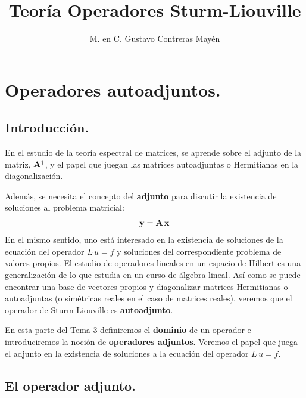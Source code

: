 \documentclass[12pt]{article}
\title{\large{Teoría Operadores Sturm-Liouville}}
\author{M. en C. Gustavo Contreras Mayén}
\date{}
\numberwithin{equation}{section}
\begin{document}
\maketitle
\fontsize{14}{14}\selectfont
{}
\tableofcontents
\newpage

\section{Operadores autoadjuntos.}
\subsection{Introducción.}

En el estudio de la teoría espectral de matrices, se aprende sobre el adjunto de la matriz, $\vb{A}^{\dagger}$, y el papel que juegan las matrices autoadjuntas o Hermitianas en la diagonalización.
\par
Además, se necesita el concepto del \textbf{adjunto} para discutir la existencia de soluciones al problema matricial:
\begin{align*}
\vb{y} = \vb{A} \, \vb{x}
\end{align*}
En el mismo sentido, uno está interesado en la existencia de soluciones de la ecuación del operador $L \, u = f$ y soluciones del correspondiente problema de valores propios. El estudio de operadores lineales en un espacio de Hilbert es una generalización de lo que estudia en un curso de álgebra lineal. Así como se puede encontrar una base de vectores propios y diagonalizar matrices Hermitianas o autoadjuntas (o simétricas reales en el caso de matrices reales), veremos que el operador de Sturm-Liouville es \textbf{autoadjunto}.
\par
En esta parte del Tema 3 definiremos el \textbf{dominio} de un operador e introduciremos la noción de \textbf{operadores adjuntos}. Veremos el papel que juega el adjunto en la existencia de soluciones a la ecuación del operador $L \, u = f$.

\subsection{El operador adjunto.}
\end{document}
